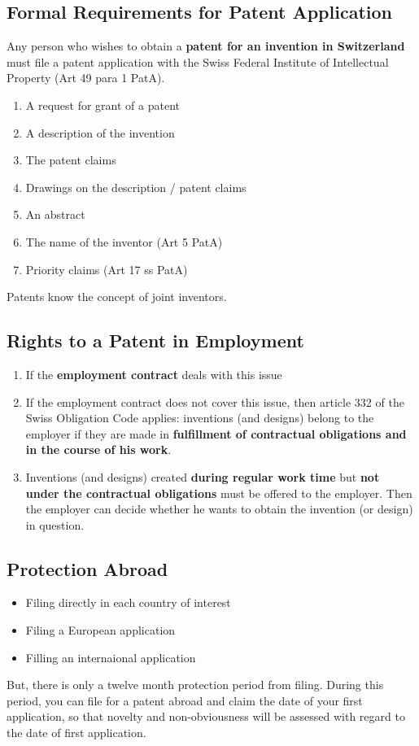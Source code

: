\documentclass[11pt]{article}
\theoremstyle{definition}
\begin{document}
\subsection{Formal Requirements for Patent Application}
Any person who wishes to obtain a \textbf{patent for an invention in Switzerland} must file a patent application with the Swiss Federal Institute of Intellectual Property (Art 49 para 1 PatA).
\begin{enumerate}
	\item A request for grant of a patent
	\item A description of the invention
	\item The patent claims
	\item Drawings on the description / patent claims
	\item An abstract
	\item The name of the inventor (Art 5 PatA)
	\item Priority claims (Art 17 ss PatA)
\end{enumerate}
Patents know the concept of joint inventors.

\subsection{Rights to a Patent in Employment}
\label{ss:RightEmployment}
\begin{enumerate}
	\item If the \textbf{employment contract} deals with this issue
	\item If the employment contract does not cover this issue, then article 332 of the Swiss Obligation Code applies: inventions (and designs) belong to the employer if they are made in \textbf{fulfillment of contractual obligations and in the course of his work}.
	\item Inventions (and designs) created \textbf{during regular work time} but \textbf{not under the contractual obligations} must be offered to the employer. Then the employer can decide whether he wants to obtain the invention (or design) in question.
\end{enumerate}

\subsection{Protection Abroad}
\begin{itemize}
	\item Filing directly in each country of interest
	\item Filing a European application
	\item Filling an internaional application
\end{itemize}
But, there is only a twelve month protection period from filing. During this period, you can file for a patent abroad and claim the date of your first application, so that novelty and non-obviousness will be assessed with regard to the date of first application.
\end{document}
